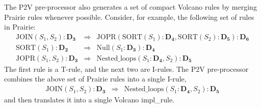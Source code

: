 The P2V pre-processor also generates a set of compact Volcano rules by
merging Prairie rules whenever possible.  Consider, for example, the
following set of rules in Prairie:
\begin{eqnarray*}
{\scriptstyle \text{JOIN}(S_1, S_2):\mathbf{D_3}}
  & \Longrightarrow &
{\scriptstyle \text{JOPR}(\text{SORT}(S_1):\mathbf{D_4},
        \text{SORT}(S_2):\mathbf{D_5}):\mathbf{D_6}} \\
{\scriptstyle \text{SORT}(S_1):\mathbf{D_2}}
  & \Longrightarrow &
{\scriptstyle \text{Null}(S_1:\mathbf{D_3}):\mathbf{D_4}} \\
{\scriptstyle \text{JOPR}(S_1, S_2):\mathbf{D_3}}
  & \Longrightarrow &
{\scriptstyle \text{Nested\_loops}(S_1:\mathbf{D_4}, S_2):\mathbf{D_5}}
\end{eqnarray*}
The first rule is a T-rule, and the next two are I-rules.  The P2V
pre-processor combines the above set of Prairie rules into a single
I-rule,
\begin{eqnarray*}
{\scriptstyle \text{JOIN}(S_1, S_2):\mathbf{D_3}}
 & \Longrightarrow &
{\scriptstyle \text{Nested\_loops}(S_1:\mathbf{D_4}, S_2):\mathbf{D_5}}
\end{eqnarray*}
and then translates it into a single Volcano impl\_rule.
